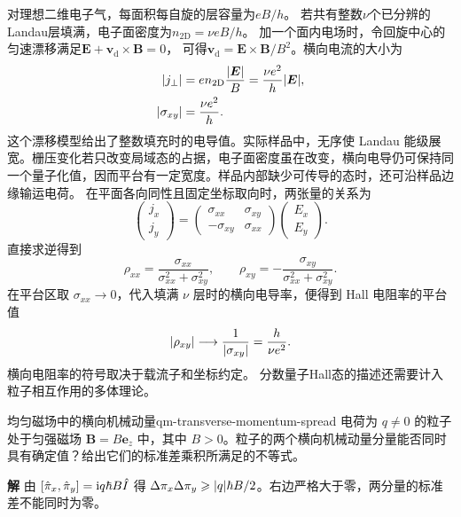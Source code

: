 对理想二维电子气，每面积每自旋的层容量为$eB/h$。
若共有整数$\nu$个已分辨的Landau层填满，电子面密度为$n_{\mathrm{2D}} = \nu eB/h$。
加一个面内电场时，令回旋中心的匀速漂移满足$\bm E + \bm v_{\mathrm d} \times \bm B = 0$，
可得$\bm v_{\mathrm d} = \bm E \times \bm B/B^2$。横向电流的大小为
\begin{subequations}
    \begin{align}
        \lvert j_\perp\rvert &= e n_{\mathrm{2D}}\frac{\lvert\bm E\rvert}{B}
        = \frac{\nu e^2}{h}\lvert\bm E\rvert,\\
        \lvert\sigma_{xy}\rvert &= \frac{\nu e^2}{h}.
    \end{align}
\end{subequations}
这个漂移模型给出了整数填充时的电导值。实际样品中，无序使 Landau 能级展宽。栅压变化若只改变局域态的占据，电子面密度虽在改变，横向电导仍可保持同一个量子化值，因而平台有一定宽度。样品内部缺少可传导的态时，还可沿样品边缘输运电荷。
在平面各向同性且固定坐标取向时，两张量的关系为
\begin{equation}
    \begin{pmatrix}j_x\\j_y\end{pmatrix}
    =
    \begin{pmatrix}
        \sigma_{xx}&\sigma_{xy}\\
        -\sigma_{xy}&\sigma_{xx}
    \end{pmatrix}
    \begin{pmatrix}E_x\\E_y\end{pmatrix}.
\end{equation}
直接求逆得到
\begin{equation}
    \rho_{xx} = \frac{\sigma_{xx}}{\sigma_{xx}^2 + \sigma_{xy}^2},
    \qquad
    \rho_{xy} = -\frac{\sigma_{xy}}{\sigma_{xx}^2 + \sigma_{xy}^2}.
\end{equation}
在平台区取 $\sigma_{xx} \to 0$，代入填满 $\nu$ 层时的横向电导率，便得到 Hall 电阻率的平台值
\begin{equation}
    \lvert\rho_{xy}\rvert \longrightarrow \frac{1}{\lvert\sigma_{xy}\rvert}
        = \frac{h}{\nu e^2}.
\end{equation}
横向电阻率的符号取决于载流子和坐标约定。
分数量子Hall态的描述还需要计入粒子相互作用的多体理论。

\begin{example}{均匀磁场中的横向机械动量}{qm-transverse-momentum-spread}
    电荷为 $q \ne 0$ 的粒子处于匀强磁场 $\bm B = B\bm e_z$ 中，其中 $B > 0$。粒子的两个横向机械动量分量能否同时具有确定值？给出它们的标准差乘积所满足的不等式。
    \par\smallskip\textbf{解}\quad
    由 $[\hat{\pi}_x,\hat{\pi}_y] = \mathrm{i} q\hbar B\hat{I}$ 得 $\Delta\pi_x\Delta\pi_y \geqslant \lvert q\rvert\hbar B/2$。右边严格大于零，两分量的标准差不能同时为零。
\end{example}
